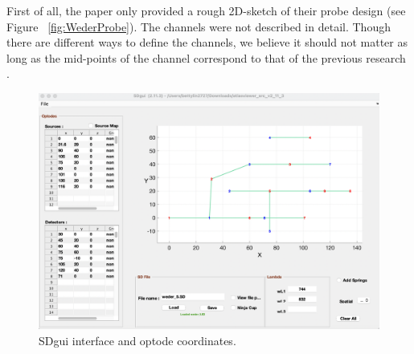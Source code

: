 First of all, the paper only provided a rough 2D-sketch of their probe design (see Figure ~\ref{fig:WederProbe}). The channels were not described in detail. Though there are different ways to define the channels, we believe it should not matter as long as the mid-points of the channel correspond to that of the previous research \citep {Weder2018}.

\begin{figure}[H]
  \centering
    \includegraphics[scale=.35]{bilder/SDgui.png}
  \caption{SDgui interface and optode coordinates.}
  \label{fig:sdgui}
\end{figure}

